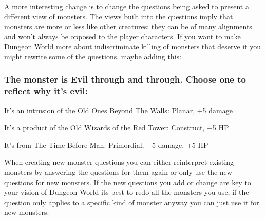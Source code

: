        

A more interesting change is to change the questions being asked to present a different view of monsters. The views built into the questions imply that monsters are more or less like other creatures: they can be of many alignments and won't always be opposed to the player characters. If you want to make Dungeon World more about indiscriminate killing of monsters that deserve it you might rewrite some of the questions, maybe adding this:

       
\subsubsection{The monster is Evil through and through. Choose one to reflect why it's evil:}       
       
\startitemize[1,packed]
         
\item It's an intrusion of the Old Ones Beyond The Walls: Planar, +5 damage

         
\item It's a product of the Old Wizards of the Red Tower: Construct, +5 HP

         
\item It's from The Time Before Man: Primordial, +5 damage, +5 HP

       
\stopitemize
       

When creating new monster questions you can either reinterpret existing monsters by answering the questions for them again or only use the new questions for new monsters. If the new questions you add or change are key to your vision of Dungeon World its best to redo all the monsters you use, if the question only applies to a specific kind of monster anyway you can just use it for new monsters.

                       
